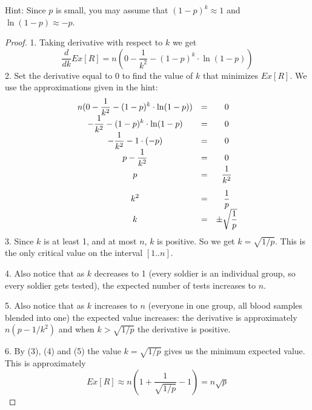 \documentclass[14pt]{extarticle}
\begin{document}
Hint: Since $p$ is small, you may assume that $(1-p)^k \approx 1$ and $\ln(1-p) \approx -p$.
\begin{proof}
1. Taking derivative with respect to $k$ we get
$$
\frac{d}{dk}Ex[R] = n(0 - \frac{1}{k^2} - (1-p)^{k}\cdot\ln(1-p))
$$
2. Set the derivative equal to 0 to find the value of $k$ that minimizes $Ex[R]$. We use the approximations given in the hint:
$$
\begin{array}{c c c}
\displaystyle n(0 - \frac{1}{k^2} - (1-p)^{k}\cdot\ln(1-p))& = & 0\\
\displaystyle - \frac{1}{k^2} - (1-p)^{k}\cdot\ln(1-p) & = & 0 \\
\displaystyle - \frac{1}{k^2} - 1\cdot(-p) & = & 0 \\
\displaystyle p - \frac{1}{k^2}& = & 0 \\
\vspace{0.3cm}
\displaystyle p & = & \displaystyle \frac{1}{k^2} \\
\displaystyle k^2 & = & \displaystyle \frac{1}{p} \\
\displaystyle k & = & \displaystyle \pm\sqrt{\frac{1}{p}} \\
\end{array}
$$
3. Since $k$ is at least 1, and at most $n$, $k$ is positive. So we get $k = \sqrt{1/p}$. This is the only critical value on the interval $[1..n]$. 

4. Also notice that as $k$ decreases to 1 (every soldier is an individual group, so every soldier gets tested), the expected number of tests increases to $n$. 

5. Also notice that as $k$ increases to $n$ (everyone in one group, all blood samples blended into one) the expected value increases: the derivative is approximately $n(p - 1/k^2)$ and when $k > \sqrt{1/p}$ the derivative is positive.

6. By (3), (4) and (5) the value $k = \sqrt{1/p}$ gives us the minimum expected value. This is approximately
$$
Ex[R] \approx n(1 + \frac{1}{\sqrt{1/p}} - 1) = n\sqrt{p}
$$
\end{proof}
\end{document}
